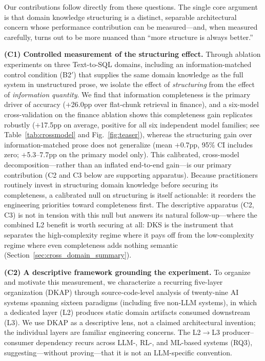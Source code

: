 \documentclass[fleqn,10pt,lineno]{wlpeerj}
\begin{document}
Our contributions follow directly from these questions. The single core argument is that domain knowledge structuring is a distinct, separable architectural concern whose performance contribution can be measured---and, when measured carefully, turns out to be more nuanced than ``more structure is always better.''

\noindent\textbf{(C1) Controlled measurement of the structuring effect.} Through ablation experiments on three Text-to-SQL domains, including an information-matched control condition (B2$'$) that supplies the same domain knowledge as the full system in unstructured prose, we isolate the effect of \textit{structuring} from the effect of \textit{information quantity}. We find that information completeness is the primary driver of accuracy ($+$26.0pp over flat-chunk retrieval in finance), and a six-model cross-validation on the finance ablation shows this completeness gain replicates robustly ($+$17.5pp on average, positive for all six independent model families; see Table~\ref{tab:crossmodel} and Fig.~\ref{fig:teaser}), whereas the structuring gain over information-matched prose does not generalize (mean $+$0.7pp, 95\% CI includes zero; $+$5.3--7.7pp on the primary model only). This calibrated, cross-model decomposition---rather than an inflated end-to-end gain---is our primary contribution (C2 and C3 below are supporting apparatus). Because practitioners routinely invest in structuring domain knowledge before securing its completeness, a calibrated null on structuring is itself actionable: it reorders the engineering priorities toward completeness first. The descriptive apparatus (C2, C3) is not in tension with this null but answers its natural follow-up---where the combined L2 benefit is worth securing at all: DKS is the instrument that separates the high-complexity regime where it pays off from the low-complexity regime where even completeness adds nothing semantic (Section~\ref{sec:cross_domain_summary}).

\noindent\textbf{(C2) A descriptive framework grounding the experiment.} To organize and motivate this measurement, we characterize a recurring five-layer organization (DKAP) through source-code-level analysis of twenty-nine AI systems spanning sixteen paradigms (including five non-LLM systems), in which a dedicated layer (L2) produces static domain artifacts consumed downstream (L3). We use DKAP as a descriptive lens, not a claimed architectural invention; the individual layers are familiar engineering concerns. The L2$\rightarrow$L3 producer--consumer dependency recurs across LLM-, RL-, and ML-based systems (RQ3), suggesting---without proving---that it is not an LLM-specific convention.
\end{document}
